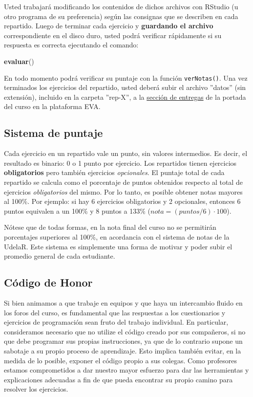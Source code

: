 \documentclass[]{article}
\newenvironment{Shaded}{}{}
\newcommand{\KeywordTok}[1]{\textcolor[rgb]{0.00,0.44,0.13}{\textbf{{#1}}}}
\newcommand{\NormalTok}[1]{{#1}}
\begin{document}
Usted trabajará modificando los contenidos de dichos archivos con
RStudio (u otro programa de su preferencia) según las consignas que se
describen en cada repartido. Luego de terminar cada ejercicio y
\textbf{guardando el archivo} correspondiente en el disco duro, usted
podrá verificar rápidamente si su respuesta es correcta ejecutando el
comando:

\begin{Shaded}
\begin{Highlighting}[]
\KeywordTok{evaluar}\NormalTok{()}
\end{Highlighting}
\end{Shaded}
En todo momento podrá verificar su puntaje con la función
\texttt{verNotas()}. Una vez terminados los ejercicios del repartido,
usted deberá subir el archivo ''datos'' (sin extensión), incluido en la
carpeta ''rep-X'', a la
\href{http://eva.universidad.edu.uy/mod/assignment/view.php?id=93616}{sección
de entregas} de la portada del curso en la plataforma EVA.

\subsection{Sistema de puntaje}

Cada ejercicio en un repartido vale un punto, sin valores intermedios.
Es decir, el resultado es binario: 0 o 1 punto por ejercicio. Los
repartidos tienen ejercicios \textbf{obligatorios} pero también
ejercicios \emph{opcionales}. El puntaje total de cada repartido se
calcula como el porcentaje de puntos obtenidos respecto al total de
ejercicios \emph{obligatorios} del mismo. Por lo tanto, es posible
obtener notas mayores al 100\%. Por ejemplo: si hay 6 ejercicios
obligatorios y 2 opcionales, entonces 6 puntos equivalen a un 100\% y 8
puntos a 133\% ($nota = (puntos / 6) \cdot 100$).

Nótese que de todas formas, en la nota final del curso no se permitirán
porcentajes superiores al 100\%, en acordancia con el sistema de notas
de la UdelaR. Este sistema es simplemente una forma de motivar y poder
subir el promedio general de cada estudiante.

\subsection{Código de Honor}

Si bien animamos a que trabaje en equipos y que haya un intercambio
fluido en los foros del curso, es fundamental que las respuestas a los
cuestionarios y ejercicios de programación sean fruto del trabajo
individual. En particular, consideramos necesario que no utilize el
código creado por sus compañeros, si no que debe programar sus propias
instrucciones, ya que de lo contrario supone un sabotaje a su propio
proceso de aprendizaje. Esto implica también evitar, en la medida de lo
posible, exponer el código propio a sus colegas. Como profesores estamos
comprometidos a dar nuestro mayor esfuerzo para dar las herramientas y
explicaciones adecuadas a fin de que pueda encontrar su propio camino
para resolver los ejercicios.
\end{document}
